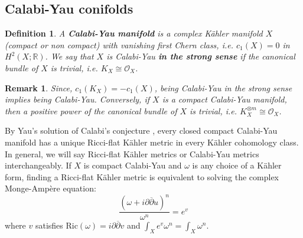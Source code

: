 \documentclass[a4paper,11pt]{article}
\newcounter{mythm}[section]
\newtheorem{defi}[mythm]{Definition}
\newtheorem{rem}[mythm]{Remark}
\def\R{\mathbb{R}}
\begin{document}
\subsection{Calabi-Yau conifolds}
\begin{defi}
    A \textbf{Calabi-Yau manifold} is a complex Kähler manifold $X$ (compact or non compact) with vanishing first Chern class, i.e. $c_1(X) = 0$ in $H^2(X; \R)$. We say that $X$ is Calabi-Yau \textbf{in the strong sense} if the canonical bundle of $X$ is trivial, i.e. $K_X \cong \mathcal{O}_X$.
\end{defi}
\begin{rem}
    Since, $c_1(K_X) = - c_1(X)$, being Calabi-Yau in the strong sense implies being Calabi-Yau. Conversely, if $X$ is a compact Calabi-Yau manifold, then a positive power of the canonical bundle of $X$ is trivial, i.e. $K_X^{\otimes m} \cong \mathcal{O}_X$.
\end{rem}
By Yau's solution of Calabi's conjecture \cite{yau_ricci_1978}, every closed compact Calabi-Yau manifold has a unique Ricci-flat Kähler metric in every Kähler cohomology class. In general, we will say Ricci-flat Kähler metrics or Calabi-Yau metrics interchangeably.  If $X$ is compact Calabi-Yau and $\omega$ is any choice of a Kähler form, finding a Ricci-flat Kähler metric is equivalent to solving the complex Monge-Ampère equation:
$$
\frac{(\omega+i \partial \overline{\partial}u)^{n}}{\omega^n} = e^v
$$
where $v$ satisfies $\mathrm{Ric}(\omega)= i \partial \overline{\partial}v$ and $\int_X e^v \omega^n = \int_X \omega^n$.\\
\end{document}
